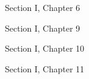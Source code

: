 \documentclass[12pt]{article}
\begin{document}
 
\medskip
 
\begin{thebibliography}{9}

        Section I, Chapter 6

        Section I, Chapter 9

        Section I, Chapter 10

        Section I, Chapter 11
      

\end{thebibliography}
                
\end{document}
